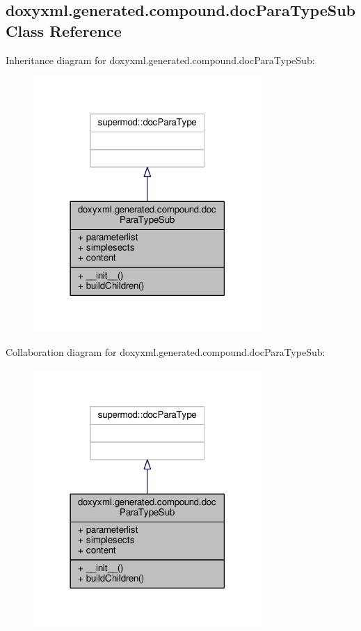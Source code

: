 \subsection{doxyxml.\+generated.\+compound.\+doc\+Para\+Type\+Sub Class Reference}
\label{classdoxyxml_1_1generated_1_1compound_1_1docParaTypeSub}


Inheritance diagram for doxyxml.\+generated.\+compound.\+doc\+Para\+Type\+Sub\+:
\nopagebreak
\begin{figure}[H]
\begin{center}
\leavevmode
\includegraphics[width=246pt]{d6/d6f/classdoxyxml_1_1generated_1_1compound_1_1docParaTypeSub__inherit__graph}
\end{center}
\end{figure}


Collaboration diagram for doxyxml.\+generated.\+compound.\+doc\+Para\+Type\+Sub\+:
\nopagebreak
\begin{figure}[H]
\begin{center}
\leavevmode
\includegraphics[width=246pt]{dc/d9b/classdoxyxml_1_1generated_1_1compound_1_1docParaTypeSub__coll__graph}
\end{center}
\end{figure}
